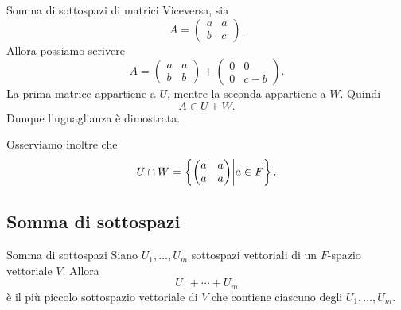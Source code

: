 \documentclass[a4paper]{article}
\begin{document}
\begin{snippetexample}{Somma di sottospazi di matrici}
    Viceversa, sia
    \[
        A=
        \begin{pmatrix}
            a & a\\
            b & c
        \end{pmatrix}.
    \]
    Allora possiamo scrivere
    \[
        A=
        \begin{pmatrix}
            a & a\\
            b & b
        \end{pmatrix}
        +
        \begin{pmatrix}
            0 & 0\\
            0 & c-b
        \end{pmatrix}.
    \]
    La prima matrice appartiene a \(U\), mentre la seconda appartiene a \(W\). Quindi
    \[
        A\in U+W.
    \]
    Dunque l'uguaglianza è dimostrata.

    Osserviamo inoltre che
    \[
        U\cap W
        =
        \left\{
            \begin{pmatrix}
                a & a\\
                a & a
            \end{pmatrix}
            \middle|
            a\in F
        \right\}.
    \]
\end{snippetexample}

\subsection{Somma di sottospazi}

\begin{snippetproposition}{Somma di sottospazi}
    Siano \(U_1,\ldots,U_m\) sottospazi vettoriali di un \(F\)-spazio vettoriale \(V\). Allora
    \[
        U_1+\cdots+U_m
    \]
    è il più piccolo sottospazio vettoriale di \(V\) che contiene ciascuno degli \(U_1,\ldots,U_m\).
\end{snippetproposition}
\end{document}
